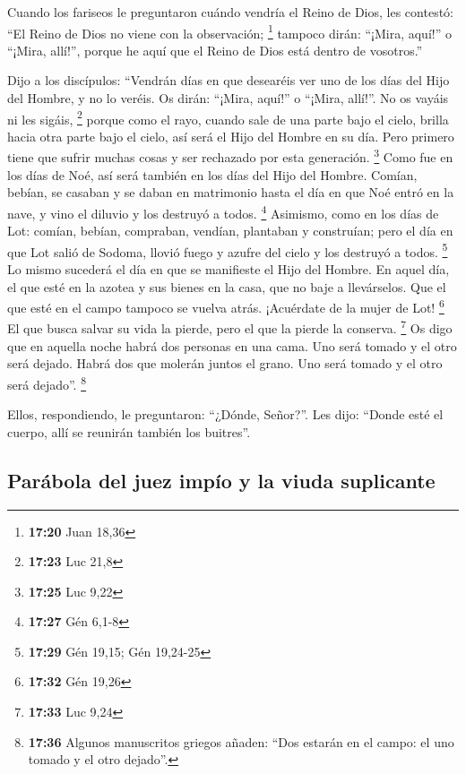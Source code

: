  Cuando los fariseos le preguntaron cuándo vendría el
Reino de Dios, les contestó: ``El Reino de Dios no viene con la
observación; \footnote{\textbf{17:20} Juan 18,36} 
tampoco dirán: ``¡Mira, aquí!'' o ``¡Mira, allí!'', porque he aquí que
el Reino de Dios está dentro de vosotros.''

 Dijo a los discípulos: ``Vendrán días en que desearéis
ver uno de los días del Hijo del Hombre, y no lo veréis. 
Os dirán: ``¡Mira, aquí!'' o ``¡Mira, allí!''. No os vayáis ni les
sigáis, \footnote{\textbf{17:23} Luc 21,8}  porque como
el rayo, cuando sale de una parte bajo el cielo, brilla hacia otra parte
bajo el cielo, así será el Hijo del Hombre en su día. 
Pero primero tiene que sufrir muchas cosas y ser rechazado por esta
generación. \footnote{\textbf{17:25} Luc 9,22}  Como fue
en los días de Noé, así será también en los días del Hijo del Hombre.
 Comían, bebían, se casaban y se daban en matrimonio
hasta el día en que Noé entró en la nave, y vino el diluvio y los
destruyó a todos. \footnote{\textbf{17:27} Gén 6,1-8} 
Asimismo, como en los días de Lot: comían, bebían, compraban, vendían,
plantaban y construían;  pero el día en que Lot salió de
Sodoma, llovió fuego y azufre del cielo y los destruyó a todos.
\footnote{\textbf{17:29} Gén 19,15; Gén 19,24-25}  Lo
mismo sucederá el día en que se manifieste el Hijo del Hombre.
 En aquel día, el que esté en la azotea y sus bienes en
la casa, que no baje a llevárselos. Que el que esté en el campo tampoco
se vuelva atrás.  ¡Acuérdate de la mujer de Lot!
\footnote{\textbf{17:32} Gén 19,26}  El que busca salvar
su vida la pierde, pero el que la pierde la conserva. \footnote{\textbf{17:33}
  Luc 9,24}  Os digo que en aquella noche habrá dos
personas en una cama. Uno será tomado y el otro será dejado.
 Habrá dos que molerán juntos el grano. Uno será tomado y
el otro será dejado''.  \footnote{\textbf{17:36} Algunos
  manuscritos griegos añaden: ``Dos estarán en el campo: el uno tomado y
  el otro dejado''.}

 Ellos, respondiendo, le preguntaron: ``¿Dónde, Señor?''.
Les dijo: ``Donde esté el cuerpo, allí se reunirán también los
buitres''.

\hypertarget{paruxe1bola-del-juez-impuxedo-y-la-viuda-suplicante}{%
\subsection{Parábola del juez impío y la viuda
suplicante}\label{paruxe1bola-del-juez-impuxedo-y-la-viuda-suplicante}}

